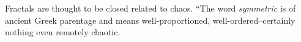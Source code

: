 Fractals are thought to be closed related to chaos.
\citet{schroeder} 
``The word \textit{symmetric} is of ancient Greek parentage and means well-proportioned, well-ordered--certainly nothing even remotely chaotic.

